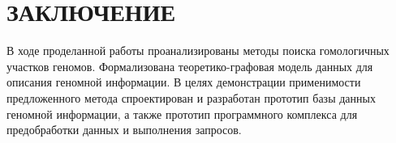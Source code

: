 \section*{ЗАКЛЮЧЕНИЕ}

В ходе проделанной работы проанализированы методы поиска гомологичных участков геномов. Формализована теоретико-графовая модель данных для описания геномной информации. В целях демонстрации применимости предложенного метода спроектирован и разработан прототип базы данных геномной информации, а также прототип программного комплекса для предобработки данных и выполнения запросов. 

\pagebreak